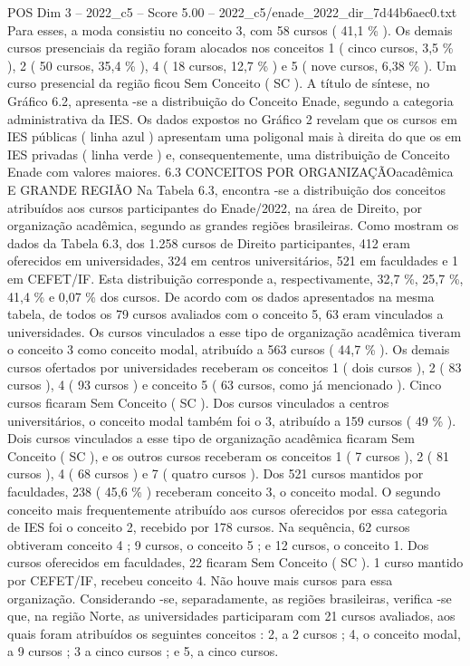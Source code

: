 \begin{textsample}{POS Dim 3 – 2022\_c5 – Score 5.00 – 2022\_c5/enade\_2022\_dir\_7d44b6aec0.txt}
Para esses, a moda consistiu no conceito 3, com 58 cursos ( 41,1 \% ).
Os demais cursos presenciais da região foram alocados nos conceitos 1 ( cinco cursos, 3,5 \% ), 2 ( 50 cursos, 35,4 \% ), 4 ( 18 cursos, 12,7 \% ) e 5 ( nove cursos, 6,38 \% ).
Um curso presencial da região ficou Sem Conceito ( SC ).
A título de síntese, no Gráfico 6.2, apresenta -se a distribuição do Conceito Enade, segundo a categoria administrativa da IES.
Os dados expostos no Gráfico 2 revelam que os cursos em IES públicas ( linha azul ) apresentam uma poligonal mais à direita do que os em IES privadas ( linha verde ) e, consequentemente, uma distribuição de Conceito Enade com valores maiores. 6.3 CONCEITOS POR ORGANIZAÇÃOacadêmica E GRANDE REGIÃO Na Tabela 6.3, encontra -se a distribuição dos conceitos atribuídos aos cursos participantes do Enade/2022, na área de Direito, por organização acadêmica, segundo as grandes regiões brasileiras.
Como mostram os dados da Tabela 6.3, dos 1.258 cursos de Direito participantes, 412 eram oferecidos em universidades, 324 em centros universitários, 521 em faculdades e 1 em CEFET/IF.
Esta distribuição corresponde a, respectivamente, 32,7 \%, 25,7 \%, 41,4 \% e 0,07 \% dos cursos.
De acordo com os dados apresentados na mesma tabela, de todos os 79 cursos avaliados com o conceito 5, 63 eram vinculados a universidades.
Os cursos vinculados a esse tipo de organização acadêmica tiveram o conceito 3 como conceito modal, atribuído a 563 cursos ( 44,7 \% ).
Os demais cursos ofertados por universidades receberam os conceitos 1 ( dois cursos ), 2 ( 83 cursos ), 4 ( 93 cursos ) e conceito 5 ( 63 cursos, como já mencionado ).
Cinco cursos ficaram Sem Conceito ( SC ).
Dos cursos vinculados a centros universitários, o conceito modal também foi o 3, atribuído a 159 cursos ( 49 \% ).
Dois cursos vinculados a esse tipo de organização acadêmica ficaram Sem Conceito ( SC ), e os outros cursos receberam os conceitos 1 ( 7 cursos ), 2 ( 81 cursos ), 4 ( 68 cursos ) e 7 ( quatro cursos ).
Dos 521 cursos mantidos por faculdades, 238 ( 45,6 \% ) receberam conceito 3, o conceito modal.
O segundo conceito mais frequentemente atribuído aos cursos oferecidos por essa categoria de IES foi o conceito 2, recebido por 178 cursos.
Na sequência, 62 cursos obtiveram conceito 4 ; 9 cursos, o conceito 5 ; e 12 cursos, o conceito 1.
Dos cursos oferecidos em faculdades, 22 ficaram Sem Conceito ( SC ). 1 curso mantido por CEFET/IF, recebeu conceito 4.
Não houve mais cursos para essa organização.
Considerando -se, separadamente, as regiões brasileiras, verifica -se que, na região Norte, as universidades participaram com 21 cursos avaliados, aos quais foram atribuídos os seguintes conceitos : 2, a 2 cursos ; 4, o conceito modal, a 9 cursos ; 3 a cinco cursos ; e 5, a cinco cursos.

\end{textsample}
